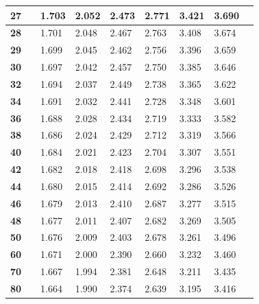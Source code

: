 \begin{longtable}{|l|l l|l|l|l|l|l|l|}
    \textbf{27} & & 1.703 & 2.052 & 2.473 & 2.771 & 3.421 & 3.690\\ \hline
    
    \textbf{28} & & 1.701 & 2.048 & 2.467 & 2.763 & 3.408 & 3.674\\ \hline
    
    \textbf{29} & & 1.699 & 2.045 & 2.462 & 2.756 & 3.396 & 3.659\\ \hline
    
    \textbf{30} & & 1.697 & 2.042 & 2.457 & 2.750 & 3.385 & 3.646\\ \hline
    
    \textbf{32} & & 1.694 & 2.037 & 2.449 & 2.738 & 3.365 & 3.622\\ \hline
    
    \textbf{34} & & 1.691 & 2.032 & 2.441 & 2.728 & 3.348 & 3.601\\ \hline
    
    \textbf{36} & & 1.688 & 2.028 & 2.434 & 2.719 & 3.333 & 3.582\\ \hline
    
    \textbf{38} & & 1.686 & 2.024 & 2.429 & 2.712 & 3.319 & 3.566\\ \hline
    
    \textbf{40} & & 1.684 & 2.021 & 2.423 & 2.704 & 3.307 & 3.551\\ \hline
    
    \textbf{42} & & 1.682 & 2.018 & 2.418 & 2.698 & 3.296 & 3.538\\ \hline
    
    \textbf{44} & & 1.680 & 2.015 & 2.414 & 2.692 & 3.286 & 3.526\\ \hline
    
    \textbf{46} & & 1.679 & 2.013 & 2.410 & 2.687 & 3.277 & 3.515\\ \hline
    
    \textbf{48} & & 1.677 & 2.011 & 2.407 & 2.682 & 3.269 & 3.505\\ \hline
    
    \textbf{50} & & 1.676 & 2.009 & 2.403 & 2.678 & 3.261 & 3.496\\ \hline
    
    \textbf{60} & & 1.671 & 2.000 & 2.390 & 2.660 & 3.232 & 3.460\\ \hline
    
    \textbf{70} & & 1.667 & 1.994 & 2.381 & 2.648 & 3.211 & 3.435\\ \hline
    
    \textbf{80} & & 1.664 & 1.990 & 2.374 & 2.639 & 3.195 & 3.416\\ \hline
    

\end{longtable}
